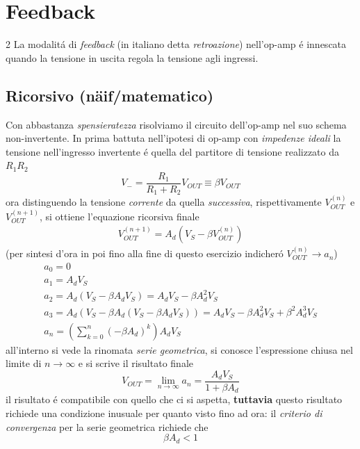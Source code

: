 \section*{Feedback}
\begin{multicols}{2}
  La modalit\'a di \textit{feedback} (in italiano detta \textit{retroazione}) nell'op-amp
  \'e innescata quando la tensione in uscita regola la tensione agli ingressi.

  \subsection*{Ricorsivo (n\"aif/matematico)}
  Con abbastanza \textit{spensieratezza} risolviamo il circuito dell'op-amp nel suo schema
  non-invertente. In prima battuta nell'ipotesi di op-amp con \textit{impedenze ideali}
  la tensione nell'ingresso invertente \'e quella del partitore di tensione realizzato
  da $R_1R_2$
  \begin{equation*}
    V_- = \frac{R_1}{R_1 + R_2}V_{OUT} \equiv \beta V_{OUT}
  \end{equation*}
  ora distinguendo la tensione \textit{corrente} da quella \textit{successiva},
  rispettivamente $V_{OUT}^{(n)}$ e $V_{OUT}^{(n+1)}$, si ottiene l'equazione ricorsiva finale
  \begin{equation*}
    \begin{gathered}
      \boxed{V_{OUT}^{(n+1)} = A_d(V_S - \beta V_{OUT}^{(n)})}
    \end{gathered}
  \end{equation*}
  (per sintesi d'ora in poi fino alla fine di questo esercizio indicher\'o $V_{OUT}^{(n)} \to a_n$)
  \begin{equation*}
    \begin{gathered}
      a_0 = 0 \\
      a_1 = A_dV_S \\
      a_2 = A_d(V_S - \beta A_dV_S) = A_dV_S - \beta A_d^2V_S \\
      a_3 = A_d(V_S - \beta A_d(V_S - \beta A_dV_S)) = A_dV_S - \beta A_d^2V_S + \beta^2A_d^3 V_S \\
      a_n = \left(\sum_{k=0}^n (-\beta A_d)^k\right)A_dV_S
    \end{gathered}
  \end{equation*}
  all'interno si vede la rinomata \textit{serie geometrica}, si conosce l'espressione chiusa nel limite
  di $n \to \infty$ e si scrive il risultato finale
  \begin{equation*}
    V_{OUT} = \lim_{n \to \infty} a_n = \frac{A_dV_S}{1 + \beta A_d}
  \end{equation*}
  il risultato \'e compatibile con quello che ci si aspetta, \textbf{tuttavia} questo risultato richiede
  una condizione inusuale per quanto visto fino ad ora: il \textit{criterio di convergenza} per la serie
  geometrica richiede che
  \begin{equation*}
    \boxed{\beta A_d < 1}
  \end{equation*}


\end{multicols}
